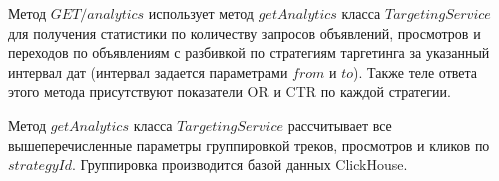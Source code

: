 \documentclass[specification,annotation,times]{itmo-student-thesis}
\begin{document}
Метод $GET /analytics$ использует метод $getAnalytics$ класса $TargetingService$ для получения статистики по количеству запросов объявлений, просмотров и переходов по объявлениям с разбивкой по стратегиям таргетинга за указанный интервал дат (интервал задается параметрами $from$ и $to$). Также теле ответа этого метода присутствуют показатели OR и CTR по каждой стратегии.

Метод $getAnalytics$ класса $TargetingService$ рассчитывает все вышеперечисленные параметры группировкой треков, просмотров и кликов по $strategyId$. Группировка производится базой данных ClickHouse.













\end{document}
